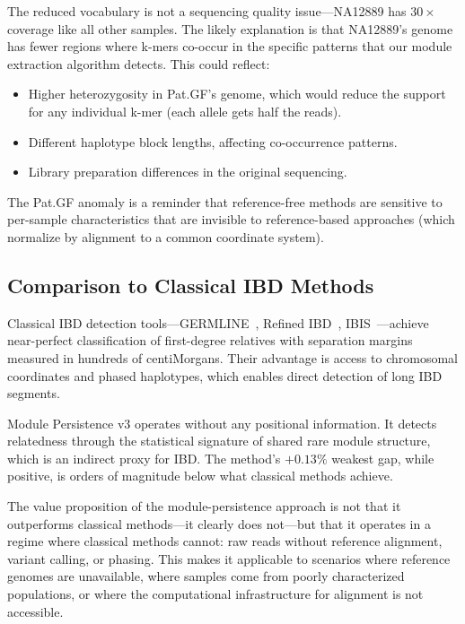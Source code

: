 \documentclass{../yalumba}
\begin{document}
The reduced vocabulary is not a sequencing quality issue---NA12889 has
$30\times$ coverage like all other samples.  The likely explanation is that
NA12889's genome has fewer regions where k-mers co-occur in the specific
patterns that our module extraction algorithm detects.  This could reflect:

\begin{itemize}
  \item Higher heterozygosity in Pat.GF's genome, which would reduce the
        support for any individual k-mer (each allele gets half the reads).
  \item Different haplotype block lengths, affecting co-occurrence patterns.
  \item Library preparation differences in the original sequencing.
\end{itemize}

The Pat.GF anomaly is a reminder that reference-free methods are sensitive
to per-sample characteristics that are invisible to reference-based
approaches (which normalize by alignment to a common coordinate system).

\subsection{Comparison to Classical IBD Methods}

Classical IBD detection tools---GERMLINE~\cite{gusev2009germline},
Refined IBD~\cite{browning2013refinedibd},
IBIS~\cite{browning2020ibis}---achieve near-perfect classification of
first-degree relatives with separation margins measured in hundreds of
centiMorgans.  Their advantage is access to chromosomal coordinates and
phased haplotypes, which enables direct detection of long IBD segments.

Module Persistence v3 operates without any positional information.  It
detects relatedness through the statistical signature of shared rare module
structure, which is an indirect proxy for IBD.  The method's $+0.13\%$
weakest gap, while positive, is orders of magnitude below what classical
methods achieve.

The value proposition of the module-persistence approach is not that it
outperforms classical methods---it clearly does not---but that it operates
in a regime where classical methods cannot: raw reads without reference
alignment, variant calling, or phasing.  This makes it applicable to
scenarios where reference genomes are unavailable, where samples come
from poorly characterized populations, or where the computational
infrastructure for alignment is not accessible.
\end{document}
